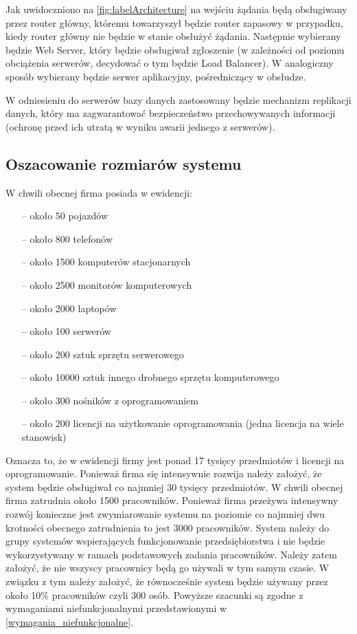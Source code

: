 Jak uwidoczniono na \ref*{fig:labelArchitecture} na wejściu żądania będą obsługiwany przez router główny, któremu towarzyszył będzie router zapasowy w przypadku, kiedy router główny nie będzie w stanie obsłużyć żądania. Następnie wybierany będzie Web Server, który będzie obsługiwał zgłoszenie (w zależności od poziomu obciążenia serwerów, decydować o tym będzie Load Balancer). W analogiczny sposób wybierany będzie serwer aplikacyjny, pośredniczący w obsłudze.

W odniesieniu do serwerów bazy danych zastosowany będzie mechanizm replikacji danych, który ma zagwarantować bezpieczeństwo przechowywanych informacji (ochronę przed ich utratą w wyniku awarii jednego z serwerów).

\subsection{Oszacowanie rozmiarów systemu}

W chwili obecnej firma posiada w ewidencji:

\begin{itemize}
\item[--] około 50 pojazdów
\item[--] około 800 telefonów
\item[--] około 1500 komputerów stacjonarnych
\item[--] około 2500 monitorów komputerowych
\item[--] około 2000 laptopów
\item[--] około 100 serwerów
\item[--] około 200 sztuk sprzętu serwerowego
\item[--] około 10000 sztuk innego drobnego sprzętu komputerowego
\item[--] około 300 nośników z oprogramowaniem
\item[--] około 200 licencji na użytkowanie oprogramowania (jedna licencja na wiele stanowisk)
\end{itemize}

Oznacza to, że w ewidencji firmy jest ponad 17 tysięcy przedmiotów i
licencji na oprogramowanie. Ponieważ firma się intensywnie rozwija
należy założyć, że system będzie obsługiwał co najmniej 30 tysięcy
przedmiotów. W chwili obecnej firma zatrudnia około 1500
pracowników. Ponieważ firma przeżywa intensywny rozwój konieczne jest
zwymiarowanie systemu na poziomie co najmniej dwu krotności obecnego
zatrudnienia to jest 3000 pracowników. System należy do grupy systemów
wspierających funkcjonowanie przedsiębiorstwa i nie będzie
wykorzystywany w ramach podstawowych zadania pracowników. Należy zatem
założyć, że nie wszyscy pracownicy będą go używali w tym samym
czasie. W związku z tym należy założyć, że równocześnie system będzie
używany przez około 10\% pracowników czyli 300 osób. Powyższe szacunki
są zgodne z wymaganiami niefunkcjonalnymi przedstawionymi w
\ref{wymagania_niefunkcjonalne}.

